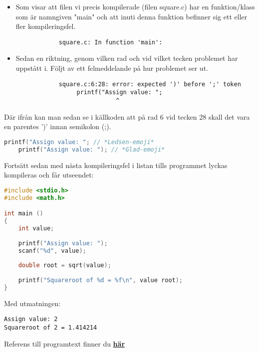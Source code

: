 \documentclass[../main.tex]{subfiles}
\begin{document}
\begin{itemize}

        
    \item Som visar att filen vi precis kompilerade (filen square.c) har en funktion/klass som är namngiven "main" och att inuti denna funktion befinner sig ett eller fler kompileringsfel.
    
        \begin{lstlisting}
            square.c: In function 'main':
        \end{lstlisting}

    \item Sedan en riktning, genom vilken rad och vid vilket tecken problemet har uppstått i. Följt av ett felmeddelande på hur problemet ser ut.
    
        \begin{lstlisting}
            square.c:6:28: error: expected ')' before ';' token
                 printf("Assign value: ";
                            ^
        \end{lstlisting}


\end{itemize}


Där ifrån kan man sedan se i källkoden att på rad 6 vid tecken 28 skall det vara en parentes ')' innan semikolon (;).
\begin{lstlisting}[language=c]
    printf("Assign value: "; // *Ledsen-emoji*
    printf("Assign value: "); // *Glad-emoji* 
\end{lstlisting}

\newpage

Fortsätt sedan med nästa kompileringsfel i listan tills programmet lyckas kompileras och får utseendet:

\begin{lstlisting}[language=c]
#include <stdio.h>
#include <math.h>

int main ()
{
    int value;
    
    printf("Assign value: ");
    scanf("%d", value); 
    
    double root = sqrt(value);
    
    printf("Squareroot of %d = %f\n", value root);
}
\end{lstlisting}
Med utmatningen:
\begin{lstlisting}
Assign value: 2                                                                                                                           
Squareroot of 2 = 1.414214
\end{lstlisting}

\begin{tcolorbox}[colback=green!5!white,colframe=green!75!black]
 Referens till programtext finner du \hyperref[sec:compile]{\textbf{här}}
\end{tcolorbox}


\newpage
\end{document}
